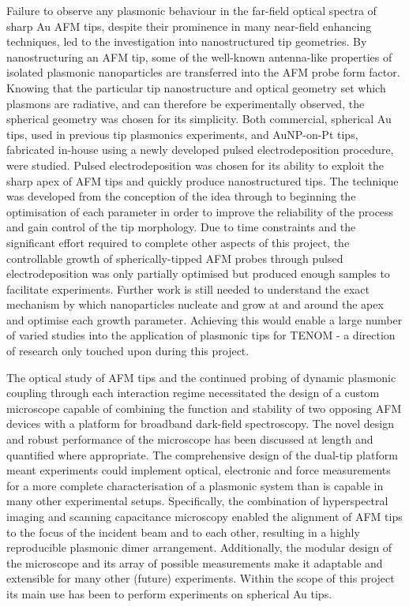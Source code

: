 \documentclass[12pt, a4paper, oneside]{book}
\begin{document}
Failure to observe any plasmonic behaviour in the far-field optical spectra of sharp Au AFM tips, despite their prominence in many near-field enhancing techniques, led to the investigation into nanostructured tip geometries. By nanostructuring an AFM tip, some of the well-known antenna-like properties of isolated plasmonic nanoparticles are transferred into the AFM probe form factor. Knowing that the particular tip nanostructure and optical geometry set which plasmons are radiative, and can therefore be experimentally observed, the spherical geometry was chosen for its simplicity. Both commercial, spherical Au tips, used in previous tip plasmonics experiments, and AuNP-on-Pt tips, fabricated in-house using a newly developed pulsed electrodeposition procedure, were studied. Pulsed electrodeposition was chosen for its ability to exploit the sharp apex of AFM tips and quickly produce nanostructured tips. The technique was developed from the conception of the idea through to beginning the optimisation of each parameter in order to improve the reliability of the process and gain control of the tip morphology. Due to time constraints and the significant effort required to complete other aspects of this project, the controllable growth of spherically-tipped AFM probes through pulsed electrodeposition was only partially optimised but produced enough samples to facilitate experiments.
Further work is still needed to understand the exact mechanism by which nanoparticles nucleate and grow at and around the apex and optimise each growth parameter. Achieving this would enable a large number of varied studies into the application of plasmonic tips for TENOM - a direction of research only touched upon during this project.

The optical study of AFM tips and the continued probing of dynamic plasmonic coupling through each interaction regime necessitated the design of a custom microscope capable of combining the function and stability of two opposing AFM devices with a platform for broadband dark-field spectroscopy. The novel design and robust performance of the microscope has been discussed at length and quantified where appropriate. The comprehensive design of the dual-tip platform meant experiments could implement optical, electronic and force measurements for a more complete characterisation of a plasmonic system than is capable in many other experimental setups. Specifically, the combination of hyperspectral imaging and scanning capacitance microscopy enabled the alignment of AFM tips to the focus of the incident beam and to each other, resulting in a highly reproducible plasmonic dimer arrangement. Additionally, the modular design of the microscope and its array of possible measurements make it adaptable and extensible for many other (future) experiments. Within the scope of this project its main use has been to perform experiments on spherical Au tips.
\end{document}
